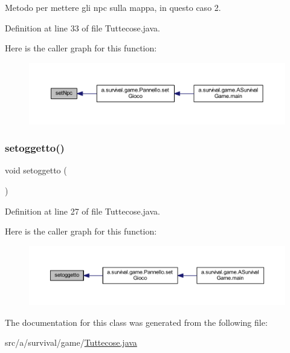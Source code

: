 Metodo per mettere gli npc sulla mappa, in questo caso 2. 



Definition at line 33 of file Tuttecose.\+java.

Here is the caller graph for this function\+:
\nopagebreak
\begin{figure}[H]
\begin{center}
\leavevmode
\includegraphics[width=350pt]{classa_1_1survival_1_1game_1_1_tuttecose_a80676eb19cc9cd7bacacb02ac21c11c7_icgraph}
\end{center}
\end{figure}
\mbox{\label{classa_1_1survival_1_1game_1_1_tuttecose_a709a0c0f5e1492a7d71d4548e5668707}} 
\subsubsection{\texorpdfstring{setoggetto()}{setoggetto()}}
{\footnotesize\ttfamily void setoggetto (\begin{DoxyParamCaption}{ }\end{DoxyParamCaption})}



Definition at line 27 of file Tuttecose.\+java.

Here is the caller graph for this function\+:
\nopagebreak
\begin{figure}[H]
\begin{center}
\leavevmode
\includegraphics[width=350pt]{classa_1_1survival_1_1game_1_1_tuttecose_a709a0c0f5e1492a7d71d4548e5668707_icgraph}
\end{center}
\end{figure}


The documentation for this class was generated from the following file\+:\begin{DoxyCompactItemize}
\item 
src/a/survival/game/\hyperlink{_tuttecose_8java}{Tuttecose.\+java}\end{DoxyCompactItemize}
